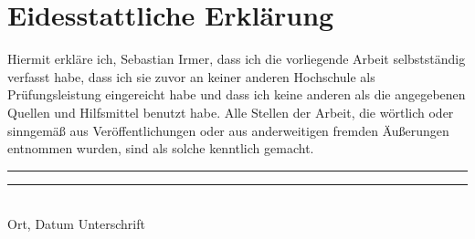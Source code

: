 
\section*{Eidesstattliche Erklärung}

Hiermit erkläre ich, Sebastian Irmer, dass ich die vorliegende Arbeit selbstständig verfasst habe, dass ich sie zuvor an keiner anderen Hochschule als Prüfungsleistung eingereicht habe und dass ich keine anderen als die angegebenen Quellen und Hilfsmittel benutzt habe. Alle Stellen der Arbeit, die wörtlich oder sinngemäß aus Veröffentlichungen oder aus anderweitigen fremden Äußerungen entnommen wurden, sind als solche kenntlich gemacht.



\vspace{3cm}

\noindent
\rule{5cm}{0.4pt} \hfill \rule{6cm}{0.4pt} \\
Ort, Datum \hfill Unterschrift
